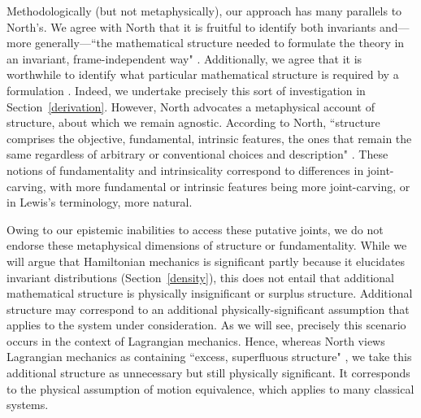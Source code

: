 \documentclass[letterpaper]{article}
\begin{document}
Methodologically (but not metaphysically), our approach has many parallels to North's. We agree with North that it is fruitful to identify both invariants and---more generally---``the mathematical structure needed to formulate the theory in an invariant, frame-independent way" \parencites*[65]{North}. Additionally, we agree that it is worthwhile to identify what particular mathematical structure is required by a formulation \parencites[78]{North}. Indeed, we undertake precisely this sort of investigation in Section~\ref{derivation}. However, North advocates a metaphysical account of structure, about which we remain agnostic. According to North, ``structure comprises the objective, fundamental, intrinsic features, the ones that remain the same regardless of arbitrary or conventional choices and description" \parencites*[66]{North}. These notions of fundamentality and intrinsicality correspond to differences in joint-carving, with more fundamental or intrinsic features being more joint-carving, or in Lewis's \parencites*[]{Lewis1983} terminology, more natural. 

Owing to our epistemic inabilities to access these putative joints, we do not endorse these metaphysical dimensions of structure or fundamentality. While we will argue that Hamiltonian mechanics is significant partly because it elucidates invariant distributions (Section~\ref{density}), this does not entail that additional mathematical structure is physically insignificant or surplus structure. Additional structure may correspond to an additional physically-significant assumption that applies to the system under consideration. As we will see, precisely this scenario occurs in the context of Lagrangian mechanics. Hence, whereas North views Lagrangian mechanics as containing ``excess, superfluous structure" \parencites*[75]{North}, we take this additional structure as unnecessary but still physically significant. It corresponds to the physical assumption of motion equivalence, which applies to many classical systems. 

\end{document}
